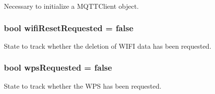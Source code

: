 Necessary to initialize a M\-Q\-T\-T\-Client object. 

\hypertarget{WIFIOnOff_8ino_a1ef1b3b96ca3b7c432a5c202037bcd43}{
\subsubsection[{wifi\-Reset\-Requested}]{\setlength{\rightskip}{0pt plus 5cm}bool wifi\-Reset\-Requested = false}}\label{WIFIOnOff_8ino_a1ef1b3b96ca3b7c432a5c202037bcd43}


State to track whether the deletion of W\-I\-F\-I data has been requested. 

\hypertarget{WIFIOnOff_8ino_a002d6cec57f207948ee9f62a3fbc12fe}{
\subsubsection[{wps\-Requested}]{\setlength{\rightskip}{0pt plus 5cm}bool wps\-Requested = false}}\label{WIFIOnOff_8ino_a002d6cec57f207948ee9f62a3fbc12fe}


State to track whether the W\-P\-S has been requested. 

